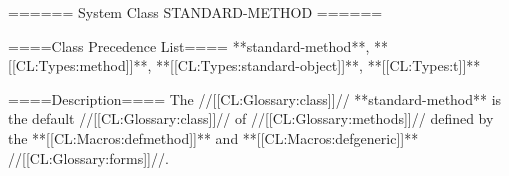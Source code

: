 ====== System Class STANDARD-METHOD ======

====Class Precedence List==== 
**standard-method**, **[[CL:Types:method]]**, **[[CL:Types:standard-object]]**, **[[CL:Types:t]]**

====Description====
The //[[CL:Glossary:class]]// **standard-method** is the default //[[CL:Glossary:class]]// of //[[CL:Glossary:methods]]// defined by the **[[CL:Macros:defmethod]]** and **[[CL:Macros:defgeneric]]** //[[CL:Glossary:forms]]//.

  
